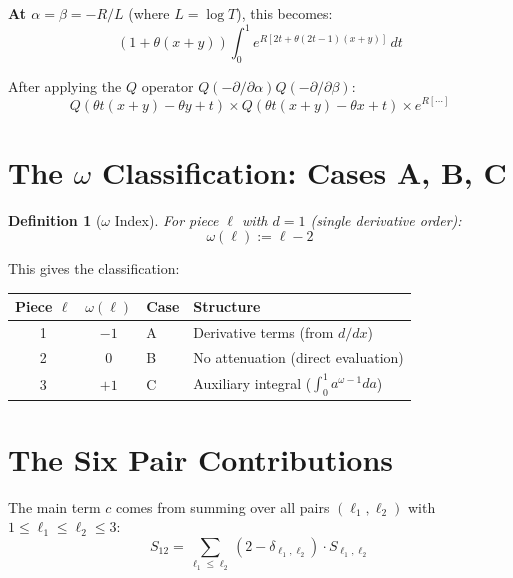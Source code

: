 \documentclass[11pt]{article}
\newtheorem{definition}{Definition}
\begin{document}
\textbf{At $\alpha = \beta = -R/L$} (where $L = \log T$), this becomes:
\begin{equation}
(1 + \theta(x+y)) \int_0^1 e^{R[2t + \theta(2t-1)(x+y)]} \, dt
\end{equation}

After applying the $Q$ operator $Q(-\partial/\partial\alpha) Q(-\partial/\partial\beta)$:
\begin{equation}
Q(\theta t(x+y) - \theta y + t) \times Q(\theta t(x+y) - \theta x + t) \times e^{R[\cdots]}
\end{equation}

\section{The $\omega$ Classification: Cases A, B, C}

\begin{definition}[$\omega$ Index]
For piece $\ell$ with $d=1$ (single derivative order):
\begin{equation}
\omega(\ell) := \ell - 2
\end{equation}
\end{definition}

This gives the classification:
\begin{center}
\begin{tabular}{ccll}
\toprule
Piece $\ell$ & $\omega(\ell)$ & Case & Structure \\
\midrule
1 & $-1$ & A & Derivative terms (from $d/dx$) \\
2 & 0 & B & No attenuation (direct evaluation) \\
3 & $+1$ & C & Auxiliary integral ($\int_0^1 a^{\omega-1} da$) \\
\bottomrule
\end{tabular}
\end{center}

\section{The Six Pair Contributions}

The main term $c$ comes from summing over all pairs $(\ell_1, \ell_2)$ with $1 \leq \ell_1 \leq \ell_2 \leq 3$:
\begin{equation}
S_{12} = \sum_{\ell_1 \leq \ell_2} (2 - \delta_{\ell_1,\ell_2}) \cdot S_{\ell_1,\ell_2}
\end{equation}
\end{document}

